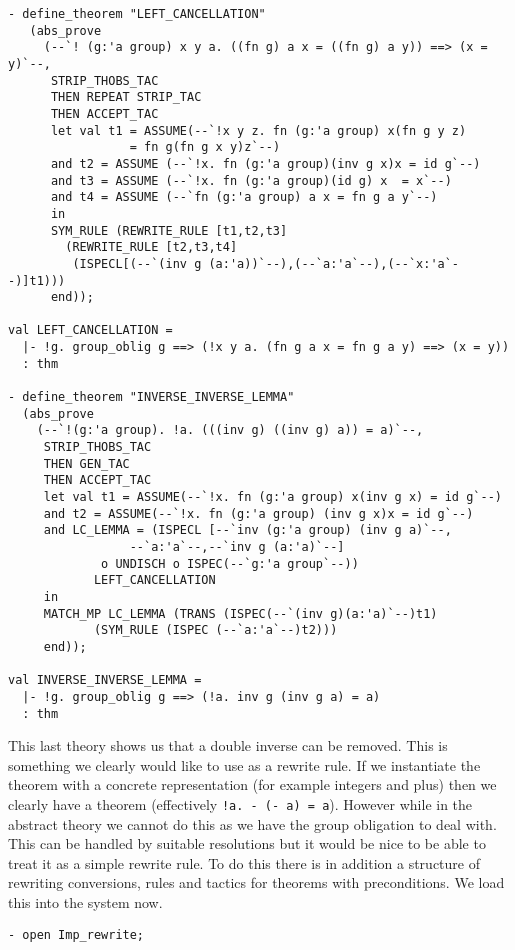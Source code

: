 \begin{small}
\begin{verbatim}
- define_theorem "LEFT_CANCELLATION"
   (abs_prove
     (--`! (g:'a group) x y a. ((fn g) a x = ((fn g) a y)) ==> (x = y)`--,
      STRIP_THOBS_TAC
      THEN REPEAT STRIP_TAC
      THEN ACCEPT_TAC 
      let val t1 = ASSUME(--`!x y z. fn (g:'a group) x(fn g y z)
			     = fn g(fn g x y)z`--)
	  and t2 = ASSUME (--`!x. fn (g:'a group)(inv g x)x = id g`--)
	  and t3 = ASSUME (--`!x. fn (g:'a group)(id g) x  = x`--)
	  and t4 = ASSUME (--`fn (g:'a group) a x = fn g a y`--)
      in
      SYM_RULE (REWRITE_RULE [t1,t2,t3] 
		(REWRITE_RULE [t2,t3,t4] 
		 (ISPECL[(--`(inv g (a:'a))`--),(--`a:'a`--),(--`x:'a`--)]t1)))
      end));

val LEFT_CANCELLATION =
  |- !g. group_oblig g ==> (!x y a. (fn g a x = fn g a y) ==> (x = y))
  : thm

- define_theorem "INVERSE_INVERSE_LEMMA"
  (abs_prove
    (--`!(g:'a group). !a. (((inv g) ((inv g) a)) = a)`--,
     STRIP_THOBS_TAC
     THEN GEN_TAC
     THEN ACCEPT_TAC 
     let val t1 = ASSUME(--`!x. fn (g:'a group) x(inv g x) = id g`--)
	 and t2 = ASSUME(--`!x. fn (g:'a group) (inv g x)x = id g`--)
	 and LC_LEMMA = (ISPECL [--`inv (g:'a group) (inv g a)`--,
				 --`a:'a`--,--`inv g (a:'a)`--]
			 o UNDISCH o ISPEC(--`g:'a group`--))
			LEFT_CANCELLATION 
     in
     MATCH_MP LC_LEMMA (TRANS (ISPEC(--`(inv g)(a:'a)`--)t1) 
			(SYM_RULE (ISPEC (--`a:'a`--)t2)))
     end));

val INVERSE_INVERSE_LEMMA = 
  |- !g. group_oblig g ==> (!a. inv g (inv g a) = a)
  : thm
\end{verbatim}
\end{small}

This last theory shows us that a double inverse can be removed. This is
something we clearly would like to use as a rewrite rule. If we
instantiate the theorem with a concrete representation (for example
integers and plus) then we clearly have a theorem (effectively 
\verb|!a. - (- a) = a|). However while in the abstract theory we cannot 
do this as we have the group obligation to deal with. This can be 
handled by suitable resolutions but it would be nice to be able to treat
it as a simple rewrite rule. To do this there is in addition a
structure of rewriting conversions, rules and tactics for theorems with
preconditions. We load this into the system now.

\begin{small}
\begin{verbatim}
- open Imp_rewrite;
\end{verbatim}
\end{small}

